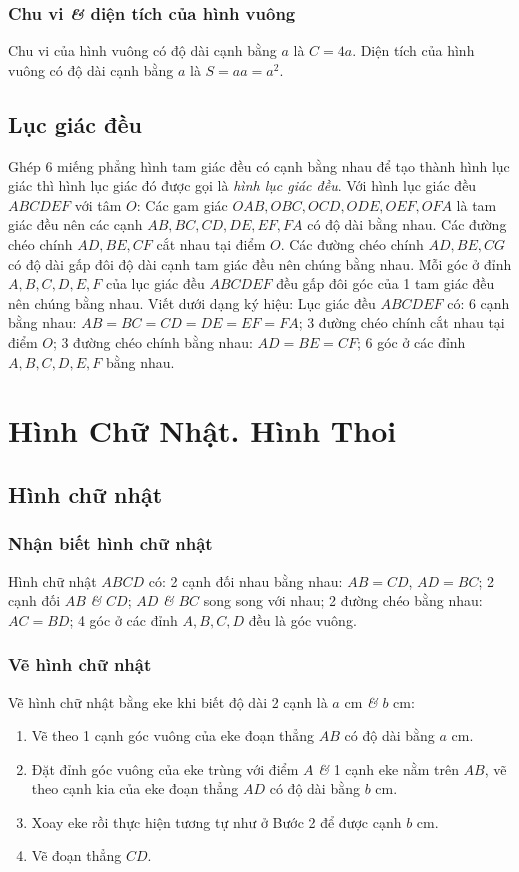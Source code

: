 \documentclass[oneside]{book}
\numberwithin{equation}{section}
\begin{document}
\subsubsection{Chu vi \textit{\&} diện tích của hình vuông}
Chu vi của hình vuông có độ dài cạnh bằng $a$ là $C = 4a$. Diện tích của hình vuông có độ dài cạnh bằng $a$ là $S = aa = a^2$.

\subsection{Lục giác đều}
Ghép 6 miếng phẳng hình tam giác đều có cạnh bằng nhau để tạo thành hình lục giác thì hình lục giác đó được gọi là \emph{hình lục giác đều}. Với hình lục giác đều $ABCDEF$ với tâm $O$: Các gam giác $OAB,OBC,OCD,ODE,OEF,OFA$ là tam giác đều nên các cạnh $AB,BC,CD,DE,EF,FA$ có độ dài bằng nhau. Các đường chéo chính $AD,BE,CF$ cắt nhau tại điểm $O$. Các đường chéo chính $AD,BE,CG$ có độ dài gấp đôi độ dài cạnh tam giác đều nên chúng bằng nhau. Mỗi góc ở đỉnh $A,B,C,D,E,F$ của lục giác đều $ABCDEF$ đều gấp đôi góc của 1 tam giác đều nên chúng bằng nhau. Viết dưới dạng ký hiệu: Lục giác đều $ABCDEF$ có: 6 cạnh bằng nhau: $AB = BC = CD = DE = EF = FA$; 3 đường chéo chính cắt nhau tại điểm $O$; 3 đường chéo chính bằng nhau: $AD = BE = CF$; 6 góc ở các đỉnh $A,B,C,D,E,F$ bằng nhau.

\section{Hình Chữ Nhật. Hình Thoi}

\subsection{Hình chữ nhật}

\subsubsection{Nhận biết hình chữ nhật}
Hình chữ nhật $ABCD$ có: 2 cạnh đối nhau bằng nhau: $AB = CD$, $AD = BC$; 2 cạnh đối $AB$ \textit{\&} $CD$; $AD$ \textit{\&} $BC$ song song với nhau; 2 đường chéo bằng nhau: $AC = BD$; 4 góc ở các đỉnh $A,B,C,D$ đều là góc vuông.

\subsubsection{Vẽ hình chữ nhật}
Vẽ hình chữ nhật bằng eke khi biết độ dài 2 cạnh là $a$ cm \textit{\&} $b$ cm:
\begin{enumerate}
	\item Vẽ theo 1 cạnh góc vuông của eke đoạn thẳng $AB$ có độ dài bằng $a$ cm.
	\item Đặt đỉnh góc vuông của eke trùng với điểm $A$ \textit{\&} 1 cạnh eke nằm trên $AB$, vẽ theo cạnh kia của eke đoạn thẳng $AD$ có độ dài bằng $b$ cm.
	\item Xoay eke rồi thực hiện tương tự như ở Bước 2 để được cạnh $b$ cm.
	\item Vẽ đoạn thẳng $CD$.
\end{enumerate}
\end{document}
